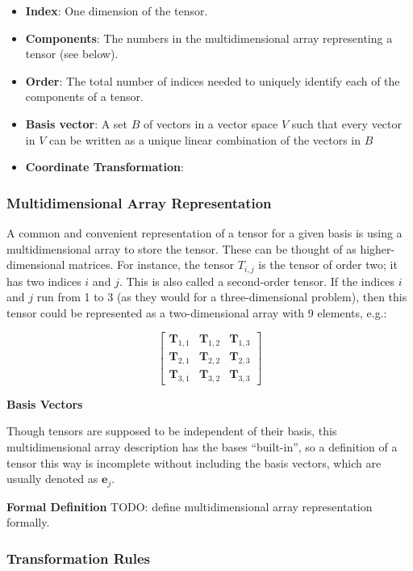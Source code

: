 \documentclass[12pt]{article}
\begin{document}
\begin{itemize}
\item \textbf{Index}: One dimension of the tensor.
\item \textbf{Components}: The numbers in the multidimensional array representing a
      tensor (see below).
\item \textbf{Order}: The total number of indices needed to uniquely identify each of the 
      components of a tensor.
\item \textbf{Basis vector}: A set $B$ of vectors in a vector space $V$ such that every 
      vector in $V$ can be written as a unique linear combination of the vectors 
      in $B$~\citep{Wikipedia_Basis_2025}
\item \textbf{Coordinate Transformation}: 
\end{itemize}

\subsubsection{Multidimensional Array Representation}
A common and convenient representation of a tensor for a given basis is using a 
multidimensional array to store the tensor. These can be thought of as higher-dimensional
matrices. For instance, the tensor $T_{i,j}$ is
the tensor of order two; it has two indices $i$ and $j$. This is also called a
second-order tensor. If the indices $i$ and $j$ run from 1 to 3 (as they would for
a three-dimensional problem), then this tensor could be represented as a two-dimensional
array with 9 elements, e.g.:

$$\begin{bmatrix}
  \mathbf T_{1,1} & \mathbf T_{1,2} & \mathbf T_{1,3}\\
  \mathbf T_{2,1} & \mathbf T_{2,2} & \mathbf T_{2,3}\\
  \mathbf T_{3,1} & \mathbf T_{3,2} & \mathbf T_{3,3}
\end{bmatrix}
$$


\medskip
\noindent\textbf{Basis Vectors}

Though tensors are supposed to be independent of their basis, this multidimensional
array description has the bases ``built-in'', so a definition of a tensor this
way is incomplete without including the basis vectors, which are usually denoted
as $\mathbf e_j$.

\noindent\textbf{Formal Definition}
TODO: define multidimensional array representation formally.

\subsubsection{Transformation Rules}
\end{document}
